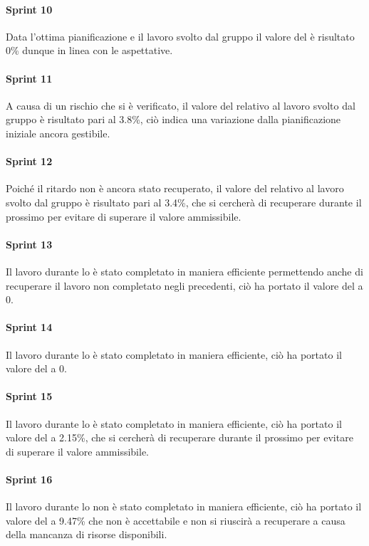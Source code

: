 \paragraph{Sprint 10}
Data l'ottima pianificazione e il lavoro svolto dal gruppo il valore del  è risultato 0\% dunque in linea con le aspettative.

\paragraph{Sprint 11}
A causa di un rischio che si è verificato, il valore del  relativo al lavoro svolto dal gruppo è risultato pari al 3.8\%, ciò indica una variazione dalla pianificazione iniziale ancora gestibile.

\paragraph{Sprint 12}
Poiché il ritardo non è ancora stato recuperato, il valore del  relativo al lavoro svolto dal gruppo è risultato pari al 3.4\%, che si cercherà di recuperare durante il prossimo  per evitare di superare il valore ammissibile.

\paragraph{Sprint 13}
Il lavoro durante lo  è stato completato in maniera efficiente permettendo anche di recuperare il lavoro non completato negli  precedenti, ciò ha portato il valore del  a 0.

\paragraph{Sprint 14}
Il lavoro durante lo  è stato completato in maniera efficiente, ciò ha portato il valore del  a 0.

\paragraph{Sprint 15}
Il lavoro durante lo  è stato completato in maniera efficiente, ciò ha portato il valore del  a 2.15\%, che si cercherà di recuperare durante il prossimo  per evitare di superare il valore ammissibile.

\paragraph{Sprint 16}
Il lavoro durante lo  non è stato completato in maniera efficiente, ciò ha portato il valore del  a 9.47\% che non è accettabile e non si riuscirà a recuperare a causa della mancanza di risorse disponibili.